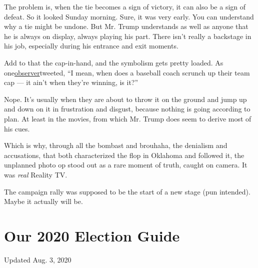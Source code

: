 The problem is, when the tie becomes a sign of victory, it can also be a
sign of defeat. So it looked Sunday morning. Sure, it was very early.
You can understand why a tie might be undone. But Mr. Trump understands
as well as anyone that he is always on display, always playing his part.
There isn't really a backstage in his job, especially during his
entrance and exit moments.

Add to that the cap-in-hand, and the symbolism gets pretty loaded. As
one\href{https://twitter.com/InkwellPaul/status/1274753478418665479}{observer}tweeted,
``I mean, when does a baseball coach scrunch up their team cap --- it
ain't when they're winning, is it?''

Nope. It's usually when they are about to throw it on the ground and
jump up and down on it in frustration and disgust, because nothing is
going according to plan. At least in the movies, from which Mr. Trump
does seem to derive most of his cues.

Which is why, through all the bombast and brouhaha, the denialism and
accusations, that both characterized the flop in Oklahoma and followed
it, the unplanned photo op stood out as a rare moment of truth, caught
on camera. It was \emph{real} Reality TV.

The campaign rally was supposed to be the start of a new stage (pun
intended). Maybe it actually will be.

\hypertarget{our-2020-election-guide}{%
\section{Our 2020 Election Guide}\label{our-2020-election-guide}}

Updated Aug. 3, 2020

